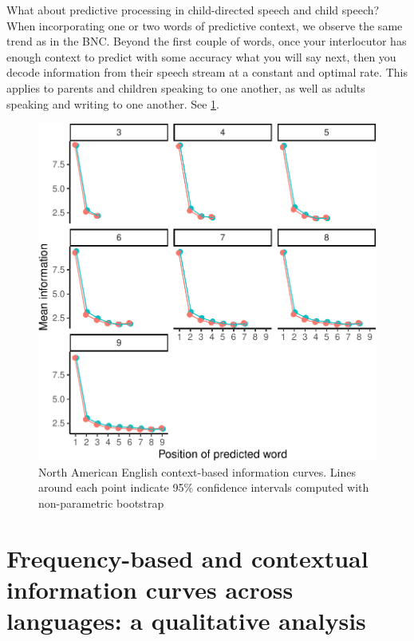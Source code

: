 \documentclass[man,floatsintext]{apa6}
\begin{document}
What about predictive processing in child-directed speech and child speech? When incorporating one or two words of predictive context, we observe the same trend as in the BNC. Beyond the first couple of words, once your interlocutor has enough context to predict with some accuracy what you will say next, then you decode information from their speech stream at a constant and optimal rate. This applies to parents and children speaking to one another, as well as adults speaking and writing to one another. See \ref{fig:eng-trigrams}.

\begin{figure}
\centering
\includegraphics{figs/eng-trigrams-1.pdf}
\caption{\label{fig:eng-trigrams}North American English context-based information curves. Lines around each point indicate 95\% confidence intervals computed with non-parametric bootstrap}
\end{figure}

\hypertarget{frequency-based-and-contextual-information-curves-across-languages-a-qualitative-analysis}{%
\section{Frequency-based and contextual information curves across languages: a qualitative analysis}\label{frequency-based-and-contextual-information-curves-across-languages-a-qualitative-analysis}}
\end{document}
